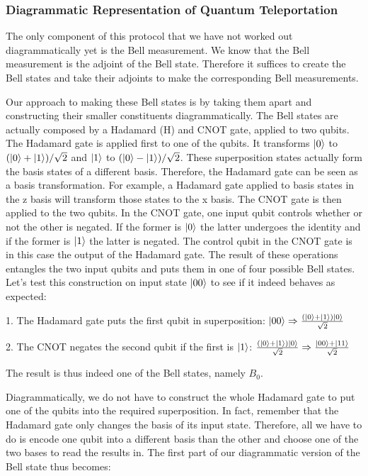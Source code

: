 \documentclass[]{article}
\begin{document}
\subsubsection{Diagrammatic Representation of Quantum Teleportation}

The only component of this protocol that we have not worked out diagrammatically yet is the Bell measurement. We know that the Bell measurement is the adjoint of the Bell state. Therefore it suffices to create the Bell states and take their adjoints to make the corresponding Bell measurements.

Our approach to making these Bell states is by taking them apart and constructing their smaller constituents diagrammatically. The Bell states are actually composed by a Hadamard (H) and CNOT gate, applied to two qubits. The Hadamard gate is applied first to one of the qubits. It transforms $\ket{0}$ to  $(\ket{0} + \ket{1})/\sqrt{2}$ and $\ket{1}$ to $(\ket{0} - \ket{1})/\sqrt{2}$. These superposition states actually form the basis states of a different basis. Therefore, the Hadamard gate can be seen as a basis transformation. For example, a Hadamard gate applied to basis states in the z basis will transform those states to the x basis. The CNOT gate is then applied to the two qubits. In the CNOT gate, one input qubit controls whether or not the other is negated. If the former is $\ket{0}$ the latter undergoes the identity and if the former is $\ket{1}$ the latter is negated. The control qubit in the CNOT gate is in this case the output of the Hadamard gate. The result of these operations entangles the two input qubits and puts them in one of four possible Bell states. Let's test this construction on input state $\ket{00}$ to see if it indeed behaves as expected:

1. The Hadamard gate puts the first qubit in superposition: $\ket{00} \Rightarrow \frac{(\ket{0} + \ket{1})\ket{0}}{\sqrt{2}}$

2. The CNOT negates the second qubit if the first is $\ket{1}$: $\frac{(\ket{0} + \ket{1})\ket{0}}{\sqrt{2}} \Rightarrow \frac{\ket{00} + \ket{11}}{\sqrt{2}}$

The result is thus indeed one of the Bell states, namely $B_0$.

Diagrammatically, we do not have to construct the whole Hadamard gate to put one of the qubits into the required superposition. In fact, remember that the Hadamard gate only changes the basis of its input state. Therefore, all we have to do is encode one qubit into a different basis than the other and choose one of the two bases to read the results in. The first part of our diagrammatic version of the Bell state thus becomes:
\end{document}
